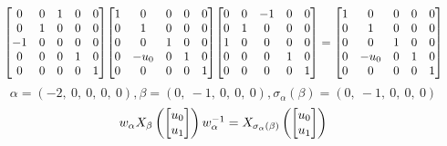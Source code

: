 \documentclass[11pt]{article}
\theoremstyle{definition}
\begin{document}
\[
\scaletoalign{\textwidth}{{\left[\begin{matrix}0 & 0 & 1 & 0 & 0\\0 & 1 & 0 & 0 & 0\\-1 & 0 & 0 & 0 & 0\\0 & 0 & 0 & 1 & 0\\0 & 0 & 0 & 0 & 1\end{matrix}\right]} {\left[\begin{matrix}1 & 0 & 0 & 0 & 0\\0 & 1 & 0 & 0 & 0\\0 & 0 & 1 & 0 & 0\\0 & - u_{0} & 0 & 1 & 0\\0 & 0 & 0 & 0 & 1\end{matrix}\right]} {\left[\begin{matrix}0 & 0 & -1 & 0 & 0\\0 & 1 & 0 & 0 & 0\\1 & 0 & 0 & 0 & 0\\0 & 0 & 0 & 1 & 0\\0 & 0 & 0 & 0 & 1\end{matrix}\right]} = {\left[\begin{matrix}1 & 0 & 0 & 0 & 0\\0 & 1 & 0 & 0 & 0\\0 & 0 & 1 & 0 & 0\\0 & - u_{0} & 0 & 1 & 0\\0 & 0 & 0 & 0 & 1\end{matrix}\right]}}
\]
\[
\alpha = \left( -2, \  0, \  0, \  0, \  0\right), \beta = \left( 0, \  -1, \  0, \  0, \  0\right), \sigma_{\alpha}(\beta) = \left( 0, \  -1, \  0, \  0, \  0\right)
\]
\[
\scaletoalign{\textwidth}{w_{\alpha} X_{\beta}\left(\left[\begin{matrix}u_{0}\\u_{1}\end{matrix}\right]\right) w_{\alpha}^{-1} = X_{\sigma_{\alpha}\left(\beta\right)}\left(\left[\begin{matrix}u_{0}\\u_{1}\end{matrix}\right]\right)}
\]
\end{document}
